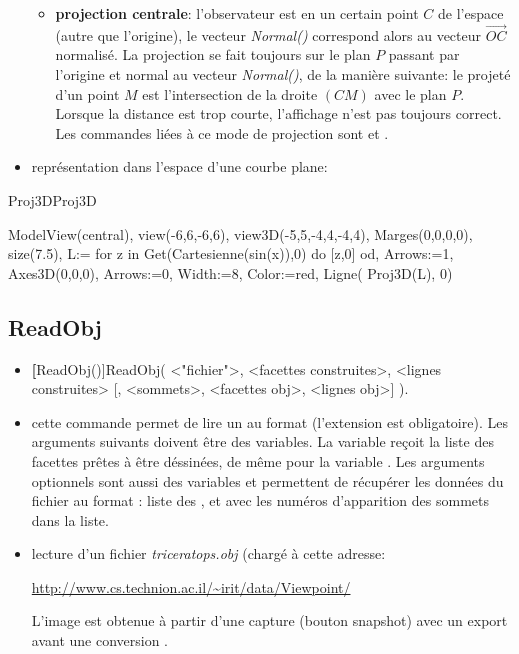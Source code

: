 \begin{itemize}
\begin{itemize}
  \item \textbf{projection centrale}: l'observateur est en un certain point $C$ de l'espace (autre que l'origine), le vecteur \textsl{Normal()} correspond alors au vecteur $\vec{OC}$ normalisé. La projection se fait toujours sur le plan $P$ passant par l'origine et normal au vecteur \textsl{Normal()}, de la manière suivante: le projeté d'un point $M$ est l'intersection de la droite $(CM)$ avec le plan $P$. Lorsque la distance est trop courte, l'affichage n'est pas toujours correct. Les commandes liées à ce mode de projection sont  et .
  \end{itemize}
 \item \exem représentation dans l'espace d'une courbe plane:
\end{itemize}


\begin{demo}{Proj3D}{Proj3D}
\begin{texgraph}[name=Proj3D]
ModelView(central), view(-6,6,-6,6),
view3D(-5,5,-4,4,-4,4),
Marges(0,0,0,0), size(7.5),
L:= for z in Get(Cartesienne(sin(x)),0)
  do [z,0] od,
Arrows:=1, Axes3D(0,0,0),
Arrows:=0, Width:=8,
Color:=red, Ligne( Proj3D(L), 0)
\end{texgraph}
\end{demo}

\subsection{ReadObj}\label{cmdReadObj}

\begin{itemize}
 \item \util \textbf[ReadObj()]{ReadObj( <"fichier">, <facettes construites>, <lignes construites> [, <sommets>, <facettes obj>, <lignes obj>] )}.
 \item \desc cette commande permet de lire un  au format  (l'extension est obligatoire). Les arguments suivants doivent être des variables. La variable  reçoit la liste des facettes prêtes à être déssinées, de même pour la variable . Les arguments optionnels sont aussi des variables et permettent de récupérer les données du fichier au format : liste des ,  et  avec les numéros d'apparition des sommets dans la liste.
 \item \exem lecture d'un fichier \textit{triceratops.obj} (chargé à cette adresse: 

\centerline{\url{http://www.cs.technion.ac.il/~irit/data/Viewpoint/}}

 L'image est obtenue à partir d'une capture (bouton snapshot) avec un export  avant une conversion .
\end{itemize}

